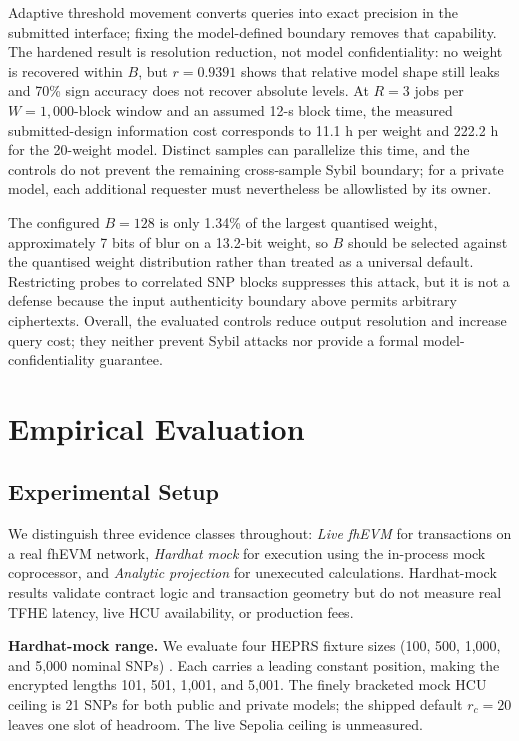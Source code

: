 \documentclass[10pt,twocolumn]{article}
\begin{document}
Adaptive threshold movement converts queries into exact precision in the submitted
interface; fixing the model-defined boundary removes that capability.  The hardened
result is resolution reduction, not model confidentiality: no weight is recovered
within $B$, but $r=0.9391$ shows that relative model shape still leaks and 70\% sign
accuracy does not recover absolute levels.  At $R=3$ jobs per $W=1{,}000$-block
window and an assumed 12-s block time, the measured submitted-design information cost
corresponds to 11.1 h per weight and 222.2 h for the 20-weight model.  Distinct samples
can parallelize this time, and the controls do not prevent the remaining cross-sample
Sybil boundary; for a private model, each additional requester must nevertheless be
allowlisted by its owner.

The configured $B=128$ is only 1.34\% of the largest quantised weight, approximately
7 bits of blur on a 13.2-bit weight, so $B$ should be selected against the quantised
weight distribution rather than treated as a universal default.  Restricting probes to
correlated SNP blocks suppresses this attack, but it is not a defense because the input
authenticity boundary above permits arbitrary ciphertexts.  Overall, the evaluated
controls reduce output resolution and increase query cost; they neither prevent Sybil
attacks nor provide a formal model-confidentiality guarantee.

\section{Empirical Evaluation}
\label{sec:evaluation}

\subsection{Experimental Setup}

We distinguish three evidence classes throughout: \emph{Live fhEVM} for transactions
on a real fhEVM network, \emph{Hardhat mock} for execution using the in-process mock
coprocessor, and \emph{Analytic projection} for unexecuted calculations.  Hardhat-mock
results validate contract logic and transaction geometry but do not measure real TFHE
latency, live HCU availability, or production fees.

\textbf{Hardhat-mock range.} We evaluate four HEPRS fixture sizes (100, 500, 1,000,
and 5,000 nominal SNPs) \citep{knight2026heprs}.  Each carries a leading constant
position, making the encrypted lengths 101, 501, 1,001, and 5,001.  The finely
bracketed mock HCU ceiling is 21 SNPs for both public and private models; the shipped
default $r_c=20$ leaves one slot of headroom.  The live Sepolia ceiling is unmeasured.
\end{document}
